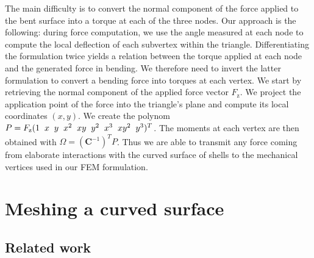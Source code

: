 \documentclass{llncs}
\begin{document}
The main difficulty is to convert the normal component of the force applied to the bent surface into a torque at each of the three nodes. Our approach is the following: during force computation, we use the angle measured at each node to compute the local deflection of each subvertex within the triangle. Differentiating the formulation twice yields a relation between the torque applied at each node and the generated force in bending. We therefore need to invert the latter formulation to convert a bending force into torques at each vertex. We start by retrieving the normal component of the applied force vector $F_{\mathrm{z}}$. We project the application point of the force into the triangle's plane and compute its local coordinates $(x,y)$. We create the polynom $P = F_{\mathrm{z}}(1 \hspace{0.2cm} x \hspace{0.2cm} y \hspace{0.2cm} x^2 \hspace{0.2cm} xy \hspace{0.2cm} y^2 \hspace{0.2cm} x^3 \hspace{0.2cm} xy^2 \hspace{0.2cm} y^3)^T$. The moments at each vertex are then obtained with $\Omega = (\textbf{C}^{-1})^T P$.  Thus we are able to transmit any force coming from elaborate interactions with the curved surface of shells to the mechanical vertices used in our FEM formulation. 

\section{Meshing a curved surface}
\label{sec:mesh}
\subsection{Related work}
\end{document}
